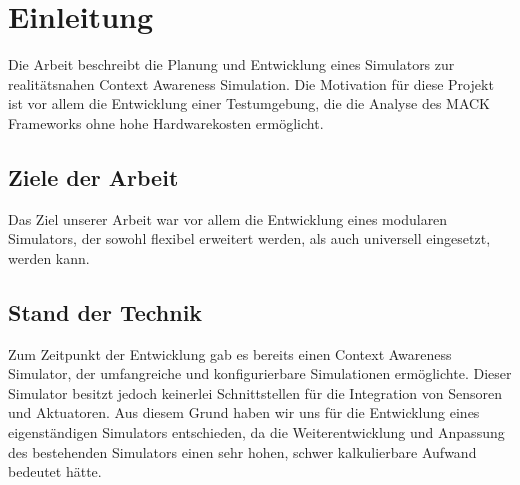 \chapter{Einleitung}\label{chapter:introduction}


Die Arbeit beschreibt die Planung und Entwicklung eines Simulators zur realitätsnahen Context Awareness Simulation. Die Motivation für diese Projekt ist vor allem die Entwicklung einer Testumgebung, die die Analyse des MACK Frameworks ohne hohe Hardwarekosten ermöglicht.

\section{Ziele der Arbeit}\label{sec:goals}

Das Ziel unserer Arbeit war vor allem die Entwicklung eines modularen Simulators, der sowohl flexibel erweitert werden, als auch universell eingesetzt, werden kann.

\section{Stand der Technik}\label{sec:state_of_art}


Zum Zeitpunkt der Entwicklung gab es bereits einen Context Awareness Simulator, der umfangreiche und konfigurierbare Simulationen ermöglichte. Dieser Simulator besitzt jedoch keinerlei Schnittstellen für die Integration von Sensoren und Aktuatoren. Aus diesem Grund haben wir uns für die Entwicklung eines eigenständigen Simulators entschieden, da die Weiterentwicklung und Anpassung des bestehenden Simulators einen sehr hohen, schwer kalkulierbare Aufwand bedeutet hätte.



